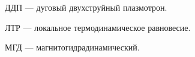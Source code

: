 

ДДП — дуговый двухструйный плазмотрон.

ЛТР — локальное термодинамическое равновесие.

МГД — магнитогидрадинамический.
